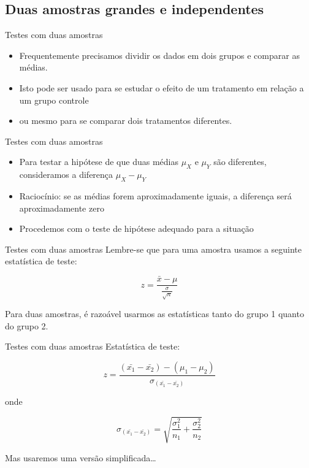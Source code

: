 \documentclass{beamer}
\begin{document}
\subsection{Duas amostras grandes e independentes}

\begin{frame}{Testes com duas amostras}
  \begin{itemize}
  \item Frequentemente precisamos dividir os dados em dois grupos e
    comparar as médias.
  \item Isto pode ser usado para se estudar o efeito de um tratamento
    em relação a um grupo controle
  \item ou mesmo para se comparar dois tratamentos diferentes.    
  \end{itemize}
\end{frame}

\begin{frame}{Testes com duas amostras}
  \begin{itemize}
  \item Para testar a hipótese de que duas médias $\mu_X$ e $\mu_Y$
    são diferentes, consideramos a diferença $\mu_X - \mu_Y$
  \item Raciocínio: se as médias forem aproximadamente iguais, a
    diferença será aproximadamente zero
  \item Procedemos com o teste de hipótese adequado para a situação
  \end{itemize}
\end{frame}

\begin{frame}{Testes com duas amostras}
Lembre-se que para uma amostra usamos a seguinte estatística de teste:

\begin{displaymath}
  z = \frac{\bar{x} - \mu}{\frac{\sigma}{\sqrt{n}}}
\end{displaymath}

Para duas amostras, é razoável usarmos as estatísticas tanto do grupo
1 quanto do grupo 2.
\end{frame}

\begin{frame}{Testes com duas amostras}
Estatística de teste:

\begin{displaymath}
  z = \frac{ (\bar{x_1} - \bar{x_2}) - (\mu_1 - \mu_2)
  }{\sigma_{(\bar{x_1} - \bar{x_2})}}
\end{displaymath}

onde 

\begin{displaymath}
  \sigma_{(\bar{x_1} - \bar{x_2})} = \sqrt{\frac{\sigma_1^2}{n_1} + \frac{\sigma^2_2}{n_2}}
\end{displaymath}

Mas usaremos uma versão simplificada\ldots
\end{frame}
\end{document}
